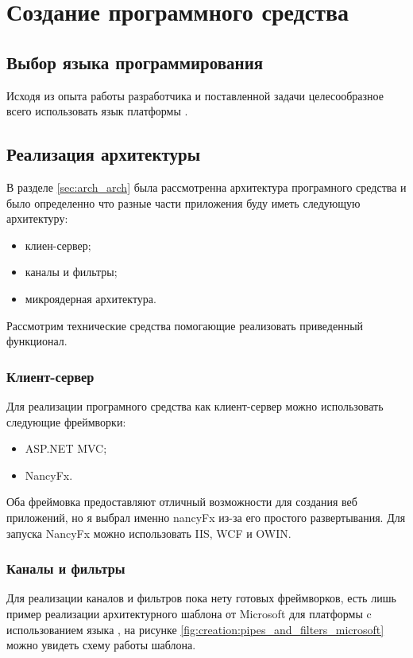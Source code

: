 \section{Создание программного средства}
\label{sec:creation}

\subsection{Выбор языка программирования}
Исходя из опыта работы разработчика и поставленной задачи целесообразное всего использовать язык \csharp{} платформы \dotnet{}.


\subsection{Реализация архитектуры}
В разделе \ref{sec:arch_arch} была рассмотренна архитектура програмного средства и было определенно что разные части приложения буду иметь следующую архитектуру:
\begin{itemize}
	\item клиен-сервер;
	\item каналы и фильтры;
	\item микроядерная архитектура.
\end{itemize}
Рассмотрим технические средства помогающие реализовать приведенный функционал.

\subsubsection{Клиент-сервер}

Для реализации програмного средства как клиент-сервер можно использовать следующие фреймворки:
\begin{itemize}
	\item ASP.NET MVC;
	\item NancyFx.
\end{itemize}
Оба фреймовка предоставляют отличный возможности для создания веб приложений, но я выбрал именно nancyFx из-за его простого развертывания. Для запуска NancyFx можно использовать IIS, WCF и OWIN.


\subsubsection{Каналы и фильтры}

Для реализации каналов и фильтров пока нету готовых фреймворков, есть лишь пример реализации архитектурного шаблона от Microsoft для платформы c использованием языка \csharp{} \cite{pipes_and_filters_pattern}, на рисунке \ref{fig:creation:pipes_and_filters_microsoft} можно увидеть схему работы шаблона.

